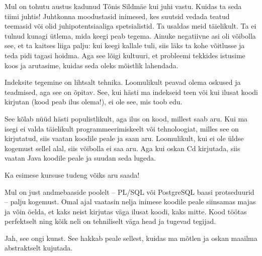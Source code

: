 Mul on tohutu austus kadunud Tõnis Sildmäe kui juhi 
vastu. Kuidas ta seda tiimi juhtis! Juhtkonna moodustasid inimesed, kes suutsid 
vedada teatud teemasid või olid juhipotentsiaaliga spetsialistid. Ta 
usaldas meid täielikult. Ta ei tulnud kunagi ütlema, mida keegi peab tegema. 
Ainuke negatiivne asi oli võibolla see, et ta kaitses liiga palju: kui 
keegi kallale tuli, siis läks ta kohe võitlusse ja teda pidi tagasi 
hoidma. Aga see lõigi kultuuri, et probleemi tekkides istusime koos
ja arutasime, kuidas seda oleks mõistlik lahendada. 


Indeksite tegemine on lihtsalt tehnika. Loomulikult peavad olema 
oskused ja teadmised, aga see on õpitav. See, kui 
hästi ma indekseid teen või kui ilusat koodi kirjutan (kood peab ilus 
olema!), ei ole see, mis toob edu. 


See kõlab nüüd hästi populistlikult, aga ilus on kood, millest saab aru. Kui ma isegi ei valda täielikult programmeerimiskeelt või 
tehnoloogiat, milles see on kirjutatud, siis vaatan koodile peale ja saan aru. 
Loomulikult, kui ei ole üldse kogemust sellel alal, siis 
võibolla ei saa aru. Aga kui oskan Cd kirjutada, siis vaatan Java koodile 
peale ja suudan seda lugeda. 


Ka esimese kursuse tudeng võiks aru saada!

Mul on just andmebaaside poolelt -- PL/SQL või PostgreSQL \mbox{baasi} protseduurid -- palju kogemust. Omal ajal vaatasin nelja inimese 
koodile peale siinsamas majas ja võin öelda, et kaks neist kirjutas väga ilusat koodi, kaks mitte. 
Kood töötas perfektselt ning kõik neli on tehniliselt väga head ja tugevad tegijad. 


Jah, see ongi kunst. See hakkab peale sellest, kuidas ma mõtlen ja 
oskan maailma abstraktselt kujutada. 


